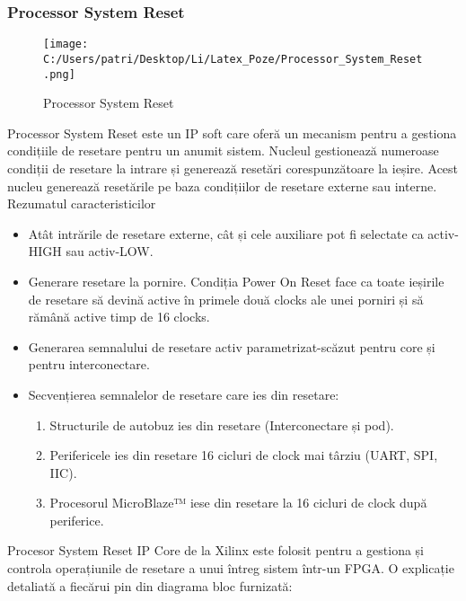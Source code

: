 \documentclass[12pt]{article}
\begin{document}
\subsubsection{Processor System Reset}

\begin{figure}[H]
    \centering
    \texttt{[image: C:/Users/patri/Desktop/Li/Latex\_Poze/Processor\_System\_Reset.png]}
    \caption{Processor System Reset}
\end{figure}

\hspace*{1cm}Processor System Reset este un IP soft care oferă un mecanism pentru a gestiona condițiile de resetare pentru un anumit sistem. Nucleul gestionează numeroase condiții de resetare la intrare și generează resetări corespunzătoare la ieșire. Acest nucleu generează resetările pe baza condițiilor de resetare externe sau interne.\\
Rezumatul caracteristicilor
\begin{itemize}
    \item Atât intrările de resetare externe, cât și cele auxiliare pot fi selectate ca activ-HIGH sau activ-LOW.
    \item Generare resetare la pornire. Condiția Power On Reset face ca toate ieșirile de resetare să devină active în primele două clocks ale unei porniri și să rămână active timp de 16 clocks. 
    \item Generarea semnalului de resetare activ parametrizat-scăzut pentru core și pentru interconectare.
    \item Secvențierea semnalelor de resetare care ies din resetare:
    \begin{enumerate}
        \item Structurile de autobuz ies din resetare (Interconectare și pod).
        \item Perifericele ies din resetare 16 cicluri de clock mai târziu (UART, SPI, IIC).
        \item Procesorul MicroBlaze™ iese din resetare la 16 cicluri de clock după periferice.
    \end{enumerate}
\end{itemize}
\hspace*{1cm}Procesor System Reset IP Core de la Xilinx este folosit pentru a gestiona și controla operațiunile de resetare a unui întreg sistem într-un FPGA. O explicație detaliată a fiecărui pin din diagrama bloc furnizată:
\end{document}
